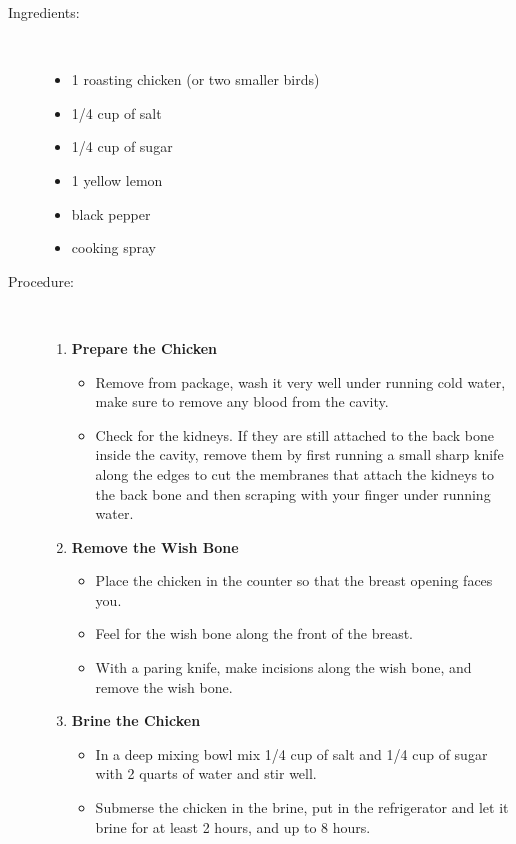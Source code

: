 \documentclass[11pt,letterpaper]{article}
\begin{document}
 
\begin {description}

\item[Ingredients:]\ \\
\begin{itemize}
	\item 1 roasting chicken (or two smaller birds)
	\item 1/4 cup of salt
	\item 1/4 cup of sugar
	\item 1 yellow lemon
	\item black pepper
	\item cooking spray
\end{itemize}

\item[Procedure:]\ \\

\begin{enumerate}
\item {\bf Prepare the Chicken}
\begin{itemize}
\item Remove from package, wash it very well under running cold water, make sure to remove any blood from the cavity. 
\item Check for the kidneys. If they are still attached to the back bone inside the cavity, remove them by first running a small sharp knife along the edges to cut the membranes that attach the kidneys to the back bone and then scraping with your finger under running water.
\end{itemize}

\item {\bf Remove the Wish Bone}
\begin{itemize}
\item Place the chicken in the counter so that the breast opening faces you. 
\item Feel for the wish bone along the front of the breast. 
\item With a paring knife, make incisions along the wish bone, and remove the wish bone. 
\end{itemize}

\item {\bf Brine the Chicken}
\begin{itemize}
\item In a deep mixing bowl mix 1/4 cup of salt and 1/4 cup of sugar with 2 quarts of water and stir well. 
\item Submerse the chicken in the brine, put in the refrigerator and let it brine for at least 2 hours, and up to 8 hours.
\end{itemize}




\end{enumerate}
\end{description}
\end{document}
